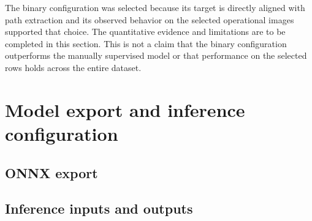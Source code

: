 The binary configuration was selected because its target is directly
aligned with path extraction and its observed behavior on the selected
operational images supported that choice. The quantitative evidence and
limitations are to be completed in this section. This is not a claim that the
binary configuration outperforms the manually supervised model or that
performance on the selected rows holds across the entire dataset.

\section{Model export and inference configuration}
\label{sec:c4_export_inference}

\subsection{ONNX export}
\label{subsec:c4_onnx_export}


\subsection{Inference inputs and outputs}
\label{subsec:c4_inference_interface}

